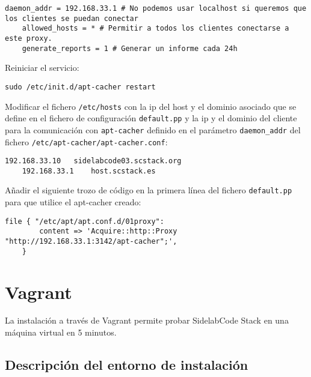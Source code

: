 \lstset{style=rubybasico}
\begin{lstlisting}[frame=trbl]
    daemon_addr = 192.168.33.1 # No podemos usar localhost si queremos que los clientes se puedan conectar
    allowed_hosts = * # Permitir a todos los clientes conectarse a este proxy.
    generate_reports = 1 # Generar un informe cada 24h
\end{lstlisting}

\par Reiniciar el servicio:

\lstset{style=rubybasico}
\begin{lstlisting}[frame=trbl]
    sudo /etc/init.d/apt-cacher restart
\end{lstlisting}

\par Modificar el fichero \texttt{/etc/hosts} con la ip del host y el dominio asociado que se define en el fichero de configuración \texttt{default.pp} y la ip y el dominio del cliente para la comunicación con \texttt{apt-cacher} definido en el parámetro \texttt{daemon\_addr} del fichero \texttt{/etc/apt-cacher/apt-cacher.conf}:

\lstset{style=rubybasico}
\begin{lstlisting}[frame=trbl]
    192.168.33.10   sidelabcode03.scstack.org
    192.168.33.1    host.scstack.es
\end{lstlisting}

\par Añadir el siguiente trozo de código en la primera línea del fichero \texttt{default.pp} para que utilice el apt-cacher creado:

\lstset{style=rubybasico}
\begin{lstlisting}[frame=trbl]
    file { "/etc/apt/apt.conf.d/01proxy":
        content => 'Acquire::http::Proxy "http://192.168.33.1:3142/apt-cacher";',
    }
\end{lstlisting}

\section{Vagrant}
\label{sec:vagrant}

\par La instalación a través de Vagrant permite probar SidelabCode Stack en una máquina virtual en 5 minutos.

\subsection{Descripción del entorno de instalación}
\label{sub:entorno-instalacion}

